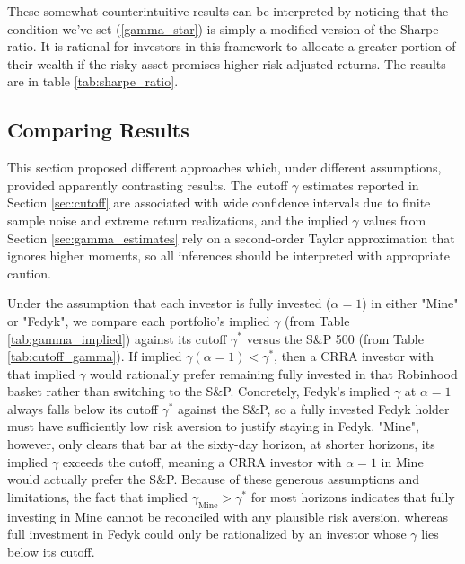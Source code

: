 These somewhat counterintuitive results can be interpreted by noticing that the condition we've set (\ref{gamma_star}) is simply a modified version of the Sharpe ratio.
It is rational for investors in this framework to allocate a greater portion of their wealth if the risky asset promises higher risk-adjusted returns.
The results are in table \ref{tab:sharpe_ratio}.

\subsection{Comparing Results}
This section proposed different approaches which, under different assumptions, provided apparently contrasting results.   
The cutoff $\gamma$ estimates reported in Section \ref{sec:cutoff} are associated with wide confidence intervals due to finite sample noise and extreme return realizations, 
and the implied $\gamma$ values from Section \ref{sec:gamma_estimates} rely on a second-order Taylor approximation that ignores higher moments, so all inferences should be interpreted with appropriate caution.  

Under the assumption that each investor is fully invested ($\alpha= 1$) in either "Mine" or "Fedyk", we compare each portfolio's implied $\gamma$ (from Table \ref{tab:gamma_implied}) against its cutoff $\gamma^*$ versus the S\&P 500 (from Table \ref{tab:cutoff_gamma}). 
If implied $\gamma(\alpha=1) < \gamma^*$, then a CRRA investor with that implied $\gamma$ would rationally prefer remaining fully invested in that Robinhood basket rather than switching to the S\&P. 
Concretely, Fedyk's implied $\gamma$ at $\alpha=1$ always falls below its cutoff $\gamma^*$ against the S\&P, so a fully invested Fedyk holder must have sufficiently low risk aversion to justify staying in Fedyk. 
"Mine", however, only clears that bar at the sixty-day horizon, at shorter horizons, its implied $\gamma$ exceeds the cutoff, meaning a CRRA investor with $\alpha=1$ in Mine would actually prefer the S\&P. 
Because of these generous assumptions and limitations, the fact that implied $\gamma_{\mathrm{Mine}} > \gamma^*$ for most horizons indicates that fully investing in Mine cannot be reconciled with any plausible risk aversion, 
whereas full investment in Fedyk could only be rationalized by an investor whose $\gamma$ lies below its cutoff.

